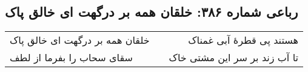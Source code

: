 \begin{center}
\section*{رباعی شماره ۳۸۶: خلقان همه بر درگهت ای خالق پاک}
\label{sec:sh386}
\begin{longtable}{l p{0.5cm} r}
خلقان همه بر درگهت ای خالق پاک
&&
هستند پی قطرهٔ آبی غمناک
\\
سقای سحاب را بفرما از لطف
&&
تا آب زند بر سر این مشتی خاک
\\
\end{longtable}
\end{center}
